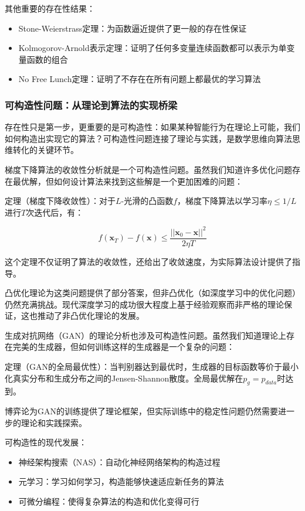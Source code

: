 其他重要的存在性结果：

\begin{itemize}
\item Stone-Weierstrass定理：为函数逼近提供了更一般的存在性保证
\item Kolmogorov-Arnold表示定理：证明了任何多变量连续函数都可以表示为单变量函数的组合
\item No Free Lunch定理：证明了不存在在所有问题上都最优的学习算法
\end{itemize}

\subsubsection{可构造性问题：从理论到算法的实现桥梁}

存在性只是第一步，更重要的是可构造性：如果某种智能行为在理论上可能，我们如何构造出实现它的算法？可构造性问题连接了理论与实践，是数学思维向算法思维转化的关键环节。

梯度下降算法的收敛性分析就是一个可构造性问题。虽然我们知道许多优化问题存在最优解，但如何设计算法来找到这些解是一个更加困难的问题：

定理（梯度下降收敛性）：对于$L$-光滑的凸函数$f$，梯度下降算法以学习率$\eta \leq 1/L$进行$T$次迭代后，有：

$$f(\mathbf{x}_T) - f(\mathbf{x}) \leq \frac{||\mathbf{x}_0 - \mathbf{x}||^2}{2\eta T}$$

这个定理不仅证明了算法的收敛性，还给出了收敛速度，为实际算法设计提供了指导。

凸优化理论为这类问题提供了部分答案，但非凸优化（如深度学习中的优化问题）仍然充满挑战。现代深度学习的成功很大程度上基于经验观察而非严格的理论保证，这也推动了非凸优化理论的发展。

生成对抗网络（GAN）的理论分析也涉及可构造性问题。虽然我们知道理论上存在完美的生成器，但如何训练这样的生成器是一个复杂的问题：

定理（GAN的全局最优性）：当判别器达到最优时，生成器的目标函数等价于最小化真实分布和生成分布之间的Jensen-Shannon散度。全局最优解在$p_g = p_{data}$时达到。

博弈论为GAN的训练提供了理论框架，但实际训练中的稳定性问题仍然需要进一步的理论和实践探索。

可构造性的现代发展：

\begin{itemize}
\item 神经架构搜索（NAS）：自动化神经网络架构的构造过程
\item 元学习：学习如何学习，构造能够快速适应新任务的算法
\item 可微分编程：使得复杂算法的构造和优化变得可行
\end{itemize}

